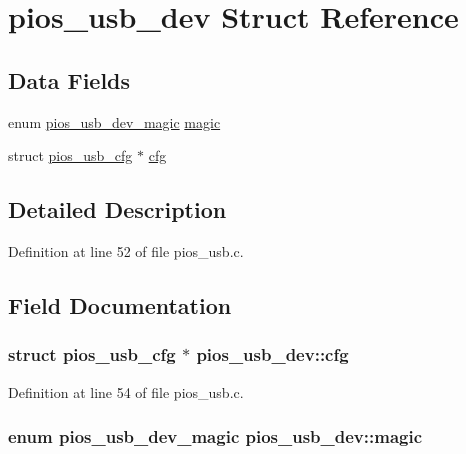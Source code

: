 \hypertarget{structpios__usb__dev}{\section{pios\-\_\-usb\-\_\-dev \-Struct \-Reference}
\label{structpios__usb__dev}
}
\subsection*{\-Data \-Fields}
\begin{DoxyCompactItemize}
\item 
enum \hyperlink{group___p_i_o_s___u_s_b_ga388809c6af586364da35c0e34ddd2a53}{pios\-\_\-usb\-\_\-dev\-\_\-magic} \hyperlink{structpios__usb__dev_a0613ccfe031d6ee209961aa2b3b3d69a}{magic}
\item 
struct \hyperlink{structpios__usb__cfg}{pios\-\_\-usb\-\_\-cfg} $\ast$ \hyperlink{structpios__usb__dev_a250e0e84a6143b57b95e939193a1cd52}{cfg}
\end{DoxyCompactItemize}


\subsection{\-Detailed \-Description}


\-Definition at line 52 of file pios\-\_\-usb.\-c.



\subsection{\-Field \-Documentation}
\hypertarget{structpios__usb__dev_a250e0e84a6143b57b95e939193a1cd52}{
\subsubsection[{cfg}]{\setlength{\rightskip}{0pt plus 5cm}struct {\bf pios\-\_\-usb\-\_\-cfg} $\ast$ {\bf pios\-\_\-usb\-\_\-dev\-::cfg}}}\label{structpios__usb__dev_a250e0e84a6143b57b95e939193a1cd52}


\-Definition at line 54 of file pios\-\_\-usb.\-c.

\hypertarget{structpios__usb__dev_a0613ccfe031d6ee209961aa2b3b3d69a}{
\subsubsection[{magic}]{\setlength{\rightskip}{0pt plus 5cm}enum {\bf pios\-\_\-usb\-\_\-dev\-\_\-magic} {\bf pios\-\_\-usb\-\_\-dev\-::magic}}}\label{structpios__usb__dev_a0613ccfe031d6ee209961aa2b3b3d69a}


